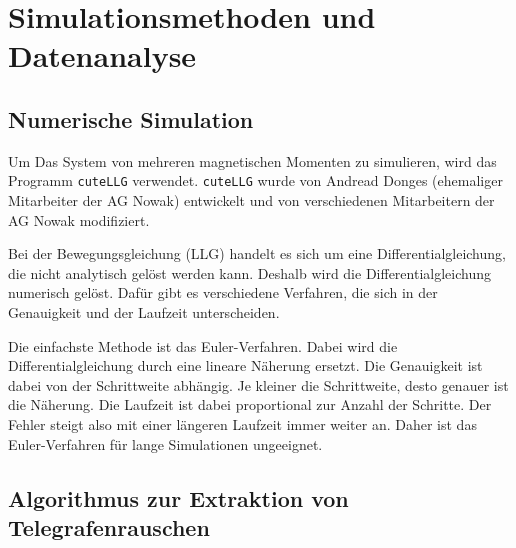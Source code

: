 \documentclass[main.tex]{subfiles}
\begin{document}
\newpage
\section{Simulationsmethoden und Datenanalyse}

\subsection{Numerische Simulation}
Um Das System von mehreren magnetischen Momenten zu simulieren, wird das
Programm \texttt{cuteLLG}\cite{cuteLLG} verwendet. \texttt{cuteLLG} wurde von
Andread Donges (ehemaliger Mitarbeiter der AG Nowak) entwickelt und von
verschiedenen Mitarbeitern der AG Nowak modifiziert.



Bei der Bewegungsgleichung (LLG) handelt es sich um eine Differentialgleichung,
die nicht analytisch gelöst werden kann.
Deshalb wird die Differentialgleichung numerisch gelöst. Dafür gibt es
verschiedene Verfahren, die sich in der Genauigkeit und der Laufzeit
unterscheiden.

Die einfachste Methode ist das Euler-Verfahren. Dabei wird die
Differentialgleichung durch eine lineare Näherung ersetzt. Die Genauigkeit ist
dabei von der Schrittweite abhängig. Je kleiner die Schrittweite, desto genauer
ist die Näherung. Die Laufzeit ist dabei proportional zur Anzahl der Schritte.
Der Fehler steigt also mit einer längeren Laufzeit immer weiter an. Daher ist
das Euler-Verfahren für lange Simulationen ungeeignet.



\cite{Computerphysik}


\subsection{Algorithmus zur Extraktion von Telegrafenrauschen}



\end{document}
